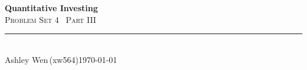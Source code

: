 \documentclass[11pt]{article}
\begin{document}
\thispagestyle{empty}
\begin{flushleft}
{\bfseries\LARGE\color{psink} Quantitative Investing}\\[3pt]
{\scshape\Large\color{psink} Problem Set 4 \textemdash\ Part III}\\[10pt]
{\color{psrule}\rule{\textwidth}{1.2pt}}\\[5pt]
{\small Ashley Wen\,(xw564)\hfill \today}
\end{flushleft}

\vspace{1.4em}


\end{document}
